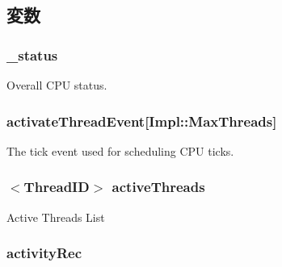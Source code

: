 \subsection{変数}
\hypertarget{classFullO3CPU_a6cdf6e6db875a442f3ab6db542bd2bb5}{
\subsubsection[{\_\-status}]{ {\bf \_\-status}}}
\label{classFullO3CPU_a6cdf6e6db875a442f3ab6db542bd2bb5}
Overall CPU status. \hypertarget{classFullO3CPU_a2cc2815b59781367286d6a31fc45e9d3}{
\subsubsection[{activateThreadEvent}]{ {\bf activateThreadEvent}\mbox{[}Impl::MaxThreads\mbox{]}}}
\label{classFullO3CPU_a2cc2815b59781367286d6a31fc45e9d3}
The tick event used for scheduling CPU ticks. \hypertarget{classFullO3CPU_ae8939711cc7f6e9c795d16df91f9f258}{
\subsubsection[{activeThreads}]{$<${\bf ThreadID}$>$ {\bf activeThreads}}}
\label{classFullO3CPU_ae8939711cc7f6e9c795d16df91f9f258}
Active Threads List \hypertarget{classFullO3CPU_ae5ad3ebe67382e7fbc7fddcf48ae9c6c}{
\subsubsection[{activityRec}]{ {\bf activityRec}}}
\label{classFullO3CPU_ae5ad3ebe67382e7fbc7fddcf48ae9c6c}
